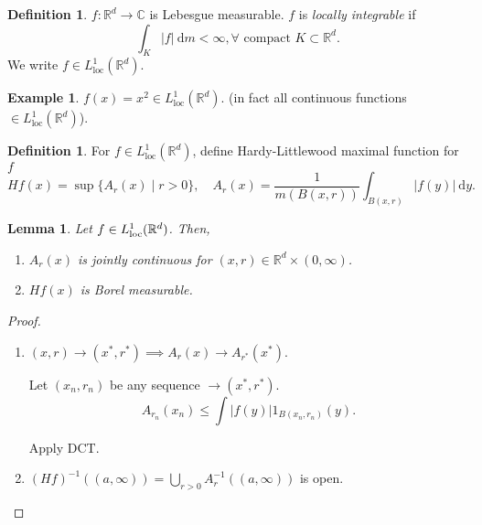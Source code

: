 \documentclass{report}
\newcommand{\R}{\mathbb{R}}
\newcommand{\C}{\mathbb{C}}
\newcommand{\df}{\ \mathrm{d}}
\newtheorem{lemma}[theorem]{Lemma}
\theoremstyle{definition}
\newtheorem{definition}[theorem]{Definition}
\newtheorem{example}[theorem]{Example}
\theoremstyle{remark}
\newcommand{\fnl}{\parbox[t]{0\linewidth}{}}
\begin{document}
\begin{definition}
	$f: \R^d \to \C$ is Lebesgue measurable. $f$ is \emph{locally integrable} if 
	\[
		\int_K |f| \df m < \infty, \forall \text{ compact }	 K \subset \R^d.
	\]
	We write $f \in L^1_{\text{loc}}(\R^d)$.
\end{definition}
\begin{example}
	$f(x) = x^2 \in L^1_{\text{loc}}(\R^d)$. (in fact all continuous functions $\in L^1_{\text{loc}}(\R^d)$).
\end{example}
\begin{definition}
	For $f \in L^1_{\text{loc}}(\R^d)$, define Hardy-Littlewood maximal function for $f$
	\[ Hf(x) = \sup \{A_r(x) \mid r > 0\}, \quad A_r(x) = \frac{1}{m(B(x, r))} \int_{B(x, r)}|f(y)| \df y.\]
\end{definition}
\begin{lemma}
	Let $f \in L^1_{\textup{loc}}(\R^d)$. Then, \begin{enumerate}
		\item $A_r(x)$ is jointly continuous for $(x, r) \in \R^d \times (0, \infty)$.
		\item $Hf(x)$ is Borel measurable.
	\end{enumerate}
\end{lemma}
\begin{proof} \fnl
	\begin{enumerate}
		\item $(x, r) \to (x^*, r^*) \implies A_r(x) \to A_{r^*}(x^*)$.

		Let $(x_n, r_n)$ be any sequence $\to (x^*, r^*)$.
		\[ A_{r_n}(x_n) \leq \int |f(y)| 1_{B(x_n, r_n)}(y).\]

		Apply DCT.

		\item $\displaystyle (Hf)^{-1}((a, \infty)) = \bigcup_{r > 0}A_r^{-1}((a, \infty))$ is open.
	\end{enumerate}
\end{proof}
\end{document}
